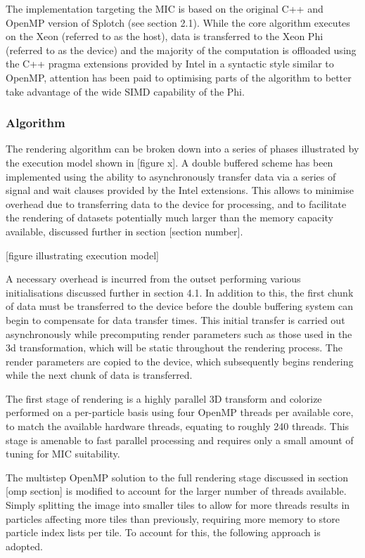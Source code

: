 \documentclass{easychair}
\begin{document}
The implementation targeting the MIC is based on the original C++ and OpenMP version of Splotch (see section 2.1). 
While the core algorithm executes on the Xeon (referred to as the host), data is transferred to the Xeon Phi (referred 
to as the device) and the majority of the computation is offloaded using the C++ pragma extensions provided by Intel 
in a syntactic style similar to OpenMP, attention has been paid to optimising parts of the algorithm to better take 
advantage of the wide SIMD capability of the Phi.


\subsubsection{Algorithm}
\label{sect:micalgorithm}

The rendering algorithm can be broken down into a series of phases illustrated by the execution model shown in [figure x]. 
A double buffered scheme has been implemented using the ability to asynchronously transfer data via a series of signal 
and wait clauses provided by the Intel extensions. This allows to minimise overhead due to transferring data to the device 
for processing, and to facilitate the rendering of datasets potentially much larger than the memory capacity available, 
discussed further in section [section number].

\medskip
\centerline{[figure illustrating execution model]}
\medskip
A necessary overhead is incurred from the outset performing various initialisations discussed further in section 4.1. In 
addition to this, the first chunk of data must be transferred to the device before the double buffering system can begin 
to compensate for data transfer times. This initial transfer is carried out asynchronously while precomputing render 
parameters such as those used in the 3d transformation, which will be static throughout the rendering process. The render 
parameters are copied to the device, which subsequently begins rendering while the next chunk of data is transferred.

The first stage of rendering is a highly parallel 3D transform and colorize performed on a per-particle basis using 
four OpenMP threads per available core, to match the available hardware threads, equating to roughly 240 threads. This 
stage is amenable to fast parallel processing and requires only a small amount of tuning for MIC suitability.

The multistep OpenMP solution to the full rendering stage discussed in section [omp section] is modified to account for 
the larger number of threads available. Simply splitting the image into smaller tiles to allow for more threads results 
in particles affecting more tiles than previously, requiring more memory to store particle index lists per tile. To 
account for this, the following approach is adopted. 
\end{document}
